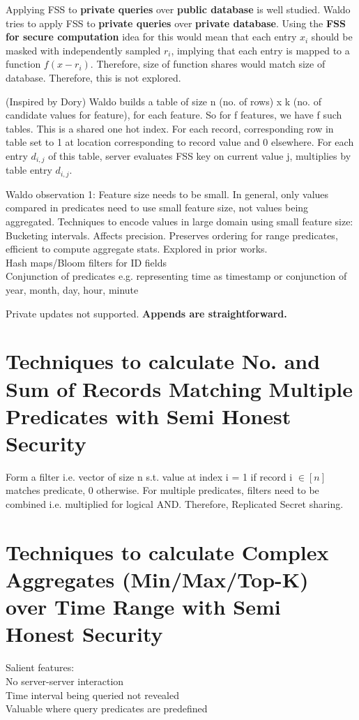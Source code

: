 Applying FSS to \textbf{private queries} over \textbf{public database} is well studied. Waldo tries to apply FSS to \textbf{private queries} over \textbf{private database}. Using the \textbf{FSS for secure computation} idea for this would mean that each entry $x_i$ should be masked with independently sampled $r_i$, implying that each entry is mapped to a function $f(x-r_i)$. Therefore, size of function shares would match size of database. Therefore, this is not explored.

(Inspired by Dory) Waldo builds a table of size n (no. of rows) x k (no. of candidate values for feature), for each feature. So for f features, we have f such tables. This is a shared one hot index. For each record, corresponding row in table set to 1 at location corresponding to record value and 0 elsewhere. For each entry $d_{i,j}$ of this table, server evaluates FSS key on current value j, multiplies by table entry $d_{i,j}$.

Waldo observation 1: Feature size needs to be small. In general, only values compared in predicates need to use small feature size, not values being aggregated. Techniques to encode values in large domain using small feature size: \\
\textbullet{} Bucketing intervals. Affects precision. Preserves ordering for range predicates, efficient to compute aggregate stats. Explored in prior works. \\
\textbullet{} Hash maps/Bloom filters for ID fields \\
\textbullet{} Conjunction of predicates e.g. representing time as timestamp or conjunction of year, month, day, hour, minute

Private updates not supported. \textbf{Appends are straightforward.}

\section{Techniques to calculate No. and Sum of Records Matching Multiple Predicates with Semi Honest Security}

Form a filter i.e. vector of size n s.t. value at index i = 1 if record i $\in [n]$ matches predicate, 0 otherwise. For multiple predicates, filters need to be combined i.e. multiplied for logical AND. Therefore, Replicated Secret sharing.


\section{Techniques to calculate Complex Aggregates (Min/Max/Top-K) over Time Range with Semi Honest Security}
Salient features:\\
\textbullet{} No server-server interaction \\
\textbullet{} Time interval being queried not revealed \\
\textbullet{} Valuable where query predicates are predefined \\

